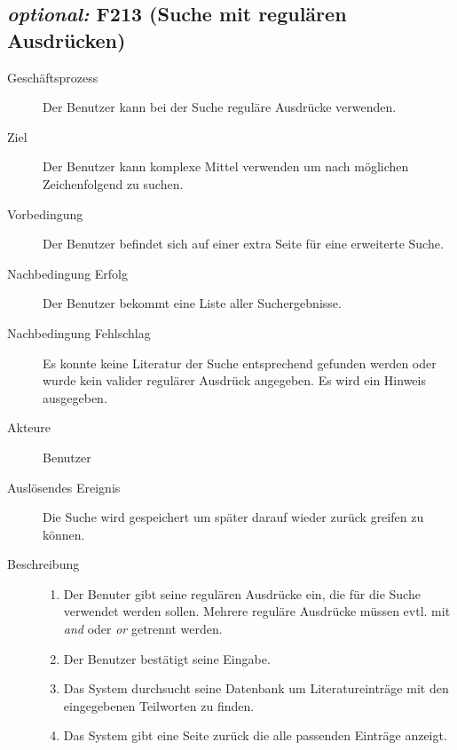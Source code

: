 \subsection{\emph{optional:} F213 (Suche mit regulären Ausdrücken)}
\begin{description}
  \item[Geschäftsprozess]Der Benutzer kann bei der Suche reguläre Ausdrücke verwenden.
  \item[Ziel]Der Benutzer kann komplexe Mittel verwenden um nach möglichen Zeichenfolgend zu suchen.
  \item[Vorbedingung]Der Benutzer befindet sich auf einer extra Seite für eine erweiterte Suche.
  \item[Nachbedingung Erfolg]Der Benutzer bekommt eine Liste aller Suchergebnisse.
  \item[Nachbedingung Fehlschlag]Es konnte keine Literatur der Suche entsprechend gefunden werden oder wurde kein valider regulärer Ausdrück angegeben. Es wird ein Hinweis ausgegeben.
  \item[Akteure]Benutzer
  \item[Auslösendes Ereignis]Die Suche wird gespeichert um später darauf wieder zurück greifen zu können.
  \item[Beschreibung]
    \begin{enumerate}
      \item Der Benuter gibt seine regulären Ausdrücke ein, die für die Suche verwendet werden sollen. Mehrere reguläre Ausdrücke müssen evtl. mit \emph{and} oder \emph{or} getrennt werden.
      \item Der Benutzer bestätigt seine Eingabe.
      \item Das System durchsucht seine Datenbank um Literatureinträge mit den eingegebenen Teilworten zu finden.
      \item Das System gibt eine Seite zurück die alle passenden Einträge anzeigt.
    \end{enumerate}
\end{description}

